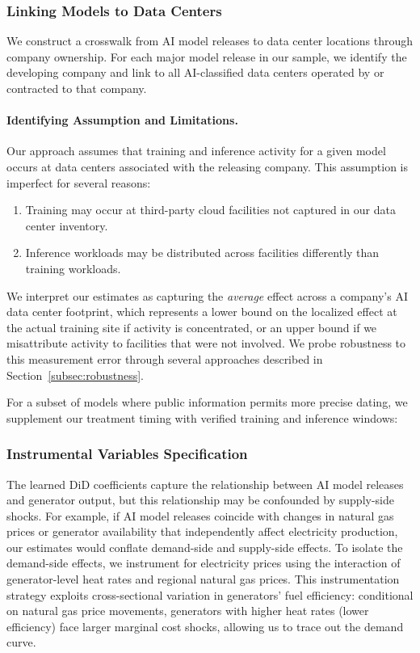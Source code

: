\documentclass[a4paper,fleqn,longmktitle]{cas-sc}
\theoremstyle{plain}
\theoremstyle{definition}
\begin{document}
\subsubsection{Linking Models to Data Centers}

We construct a crosswalk from AI model releases to data center locations through company ownership. For each major model release in our sample, we identify the developing company and link to all AI-classified data centers operated by or contracted to that company. 

\paragraph{Identifying Assumption and Limitations.} Our approach assumes that training and inference activity for a given model occurs at data centers associated with the releasing company. This assumption is imperfect for several reasons:
\begin{enumerate}
    \item Training may occur at third-party cloud facilities not captured in our data center inventory.
    \item Inference workloads may be distributed across facilities differently than training workloads.
\end{enumerate}

We interpret our estimates as capturing the \textit{average} effect across a company's AI data center footprint, which represents a lower bound on the localized effect at the actual training site if activity is concentrated, or an upper bound if we misattribute activity to facilities that were not involved. We probe robustness to this measurement error through several approaches described in Section~\ref{subsec:robustness}.

For a subset of models where public information permits more precise dating, we supplement our treatment timing with verified training and inference windows:


\subsubsection{Instrumental Variables Specification}\label{IVDetails}

The learned DiD coefficients capture the relationship between AI model releases and generator output, but this relationship may be confounded by supply-side shocks. For example, if AI model releases coincide with changes in natural gas prices or generator availability that independently affect electricity production, our estimates would conflate demand-side and supply-side effects. To isolate the demand-side effects, we instrument for electricity prices using the interaction of generator-level heat rates and regional natural gas prices. This instrumentation strategy exploits cross-sectional variation in generators' fuel efficiency: conditional on natural gas price movements, generators with higher heat rates (lower efficiency) face larger marginal cost shocks, allowing us to trace out the demand curve.
\end{document}
